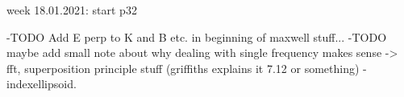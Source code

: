week 18.01.2021: start p32



-TODO Add E perp to K and B etc. in beginning of maxwell stuff...
-TODO maybe add small note about why dealing with single frequency makes sense -> fft, superposition principle stuff (griffiths explains it 7.12 or something)
-indexellipsoid.